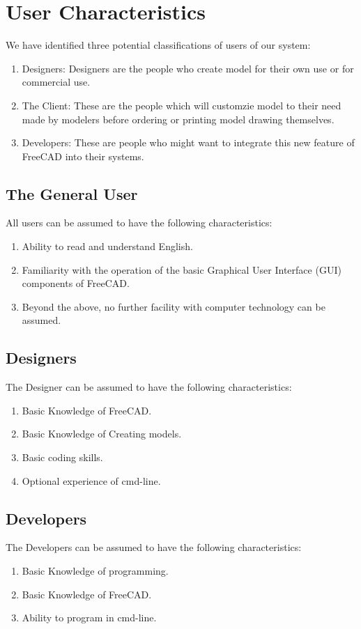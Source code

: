 \section{User Characteristics}

We have identified three potential classifications of users of our system:

\begin{enumerate}
    \item Designers: Designers are the people who create model for their own use or for commercial use.
    \item The Client: These are the people which will customzie model to their need made by modelers before ordering or printing model drawing themselves.
    \item Developers: These are people who might want to integrate this new feature of FreeCAD into their systems.
   
\end{enumerate}

\subsection{The General User}

All users can be assumed to have the following characteristics:

\begin{enumerate}
    \item Ability to read and understand English.
    \item Familiarity with the operation of the basic Graphical User Interface (GUI) components of FreeCAD.
    \item Beyond the above, no further facility with computer technology can be assumed.
\end{enumerate}

\subsection{Designers}
The Designer can be assumed to have the following characteristics:
\begin{enumerate}
    \item Basic Knowledge of FreeCAD.
    \item Basic Knowledge of Creating models.
    \item Basic coding skills.
    \item Optional experience of cmd-line.
\end{enumerate}

\subsection{Developers}
The Developers can be assumed to have the following characteristics:
\begin{enumerate}
    \item Basic Knowledge of programming.
    \item Basic Knowledge of FreeCAD.
    \item Ability to program in cmd-line.
\end{enumerate}
